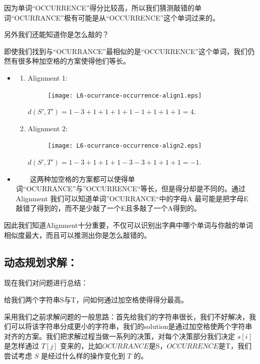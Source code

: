 
\newpage
因为单词“OCCURRENCE”得分比较高，所以我们猜测敲错的单词“OCURRANCE”极有可能是从“OCCURRENCE”这个单词过来的。

另外我们还能知道你是怎么敲的？

即使我们找到与“OCURRANCE”最相似的是“OCCURRENCE”这个单词，我们仍然有很多种加空格的方案使得他们等长。

\begin{itemize}
\item
\begin{enumerate}
\item Alignment 1:
\begin{figure}
	\texttt{[image: L6-ocurrance-occurrence-align1.eps]}
\end{figure}
$d(S',T') = 1-3+1+1+1+1-1+1+1+1 =4$.
\item Alignment 2:
\begin{figure}
	\texttt{[image: L6-ocurrance-occurrence-align2.eps]}
\end{figure}
$d(S',T') = 1-3+1+1+1-3-3+1+1+1=-1$.
\end{enumerate}

\item
    \begin{flushleft}
    ~~~~这两种加空格的方案都可以使得单词“OCURRANCE”与”OCCURRENCE“等长，但是得分却是不同的。通过Alignment 我们可以知道单词”OCURRANCE“中的字母A 最可能是把字母E 敲错了得到的，而不是少敲了一个E且多敲了一个A得到的。
    \end{flushleft}
\end{itemize}



\newpage
因此我们知道Alignment十分重要，不仅可以识别出字典中哪个单词与你敲的单词相似度最大，而且可以推测出你是怎么敲错的。

\subsection{动态规划求解：}

现在我们对问题进行总结：

给我们两个字符串S与T，问如何通过加空格使得得分最高。

采用我们之前求解问题的一般思路：首先给我们的字符串很长，我们不好解决，我们可以将该字符串分成更小的字符串，我们的solution是通过加空格使两个字符串对齐的方案。我们把求解过程当做一系列的决策，对每个决策部分我们决定 $s[i]$  是怎样通过 $T[j]$ 变来的，比如$OCURRANCE$是S，$OCCURRENCE$是T，我们尝试考虑 $S$ 是经过什么样的操作变化到 $T$ 的。

